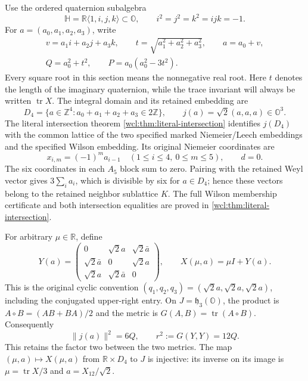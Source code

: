Use the ordered quaternion subalgebra
\[
 \mathbb H=\mathbb R\langle1,i,j,k\rangle\subset\mathbb O,
 \qquad i^2=j^2=k^2=ijk=-1.
\]
For $a=(a_0,a_1,a_2,a_3)$, write
\begin{equation}
 \begin{gathered}
 v=a_1i+a_2j+a_3k,\qquad
 t=\sqrt{a_1^2+a_2^2+a_3^2},\qquad a=a_0+v,\\
 Q=a_0^2+t^2,\qquad P=a_0(a_0^2-3t^2).
 \end{gathered}
 \label{h24:ncs:eq:quaternion-coordinates}\tag{NCS1}
\end{equation}
Every square root in this section means the nonnegative real root.
Here $t$ denotes the length of the imaginary quaternion, while the
trace invariant will always be written $\operatorname{tr}X$.
The integral domain and its retained embedding are
\begin{equation}
 D_4=\{a\in\mathbb Z^4:a_0+a_1+a_2+a_3\in2\mathbb Z\},
 \qquad j(a)=\sqrt2(a,a,a)\in\mathbb O^3.
 \label{h24:ncs:eq:lattice-embedding}\tag{NCS2}
\end{equation}
The literal intersection theorem
\cref{wcl:thm:literal-intersection} identifies $j(D_4)$ with the
common lattice of the two specified marked Niemeier/Leech embeddings
and the specified Wilson embedding. Its original Niemeier coordinates
are
\begin{equation}
 x_{i,m}=(-1)^m a_{i-1}\quad(1\le i\le4,\ 0\le m\le5),
 \qquad d=0.
 \label{h24:ncs:eq:niemeier-coordinates}\tag{NCS3}
\end{equation}
The six coordinates in each $A_5$ block sum to zero. Pairing with
the retained Weyl vector gives $3\sum_i a_i$, which is divisible
by six for $a\in D_4$; hence these vectors belong to the retained
neighbor sublattice $K$. The full Wilson membership certificate and
both intersection equalities are proved in
\cref{wcl:thm:literal-intersection}.

For arbitrary $\mu\in\mathbb R$, define
\begin{equation}
 Y(a)=\begin{pmatrix}
 0&\sqrt2a&\sqrt2\bar a\\
 \sqrt2\bar a&0&\sqrt2a\\
 \sqrt2a&\sqrt2\bar a&0
 \end{pmatrix},\qquad
 X(\mu,a)=\mu I+Y(a).
 \label{h24:ncs:eq:original-matrix}\tag{NCS4}
\end{equation}
This is the original cyclic convention
$(q_1,q_2,q_3)=(\sqrt2a,\sqrt2a,\sqrt2a)$, including the
conjugated upper-right entry. On $J=\mathfrak h_3(\mathbb O)$,
the product is $A\circ B=(AB+BA)/2$ and the metric is
$G(A,B)=\operatorname{tr}(A\circ B)$. Consequently
\begin{equation}
 \|j(a)\|^2=6Q,\qquad r^2:=G(Y,Y)=12Q.
 \label{h24:ncs:eq:two-metrics}\tag{NCS5}
\end{equation}
This retains the factor two between the two metrics. The map
$(\mu,a)\mapsto X(\mu,a)$ from $\mathbb R\times D_4$ to $J$
is injective: its inverse on its image is
$\mu=\operatorname{tr}X/3$ and $a=X_{12}/\sqrt2$.

